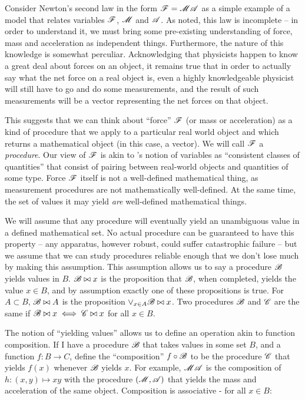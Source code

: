 Consider Newton's second law in the form $\mathscr{F}=\mathscr{MA}$ as a simple example of a model that relates variables $\mathscr{F}$, $\mathscr{M}$ and $\mathscr{A}$. As \citet{feynman_feynman_1979} noted, this law is incomplete -- in order to understand it, we must bring some pre-existing understanding of force, mass and acceleration as independent things. Furthermore, the nature of this knowledge is somewhat perculiar. Acknowledging that physicists happen to know a great deal about forces on an object, it remains true that in order to actually say what the net force on a real object is, even a highly knowledgeable physicist will still have to go and do some measurements, and the result of such measurements will be a vector representing the net forces on that object.

This suggests that we can think about ``force'' $\mathscr{F}$ (or mass or acceleration) as a kind of procedure that we apply to a particular real world object and which returns a mathematical object (in this case, a vector). We will call $\mathscr{F}$ a \emph{procedure}. Our view of $\mathscr{F}$ is akin to \citet{menger_random_2003}'s notion of variables as ``consistent classes of quantities'' that consist of pairing between real-world objects and quantities of some type. Force $\mathscr{F}$ itself is not a well-defined mathematical thing, as measurement procedures are not mathematically well-defined. At the same time, the set of values it may yield \emph{are} well-defined mathematical things.

We will assume that any procedure will eventually yield an unambiguous value in a defined mathematical set. No actual procedure can be guaranteed to have this property -- any apparatus, however robust, could suffer catastrophic failure -- but we assume that we can study procedures reliable enough that we don't lose much by making this assumption. This assumption allows us to say a procedure $\mathscr{B}$ yields values in $B$. $\mathscr{B}\bowtie x$ is the proposition that $\mathscr{B}$, when completed, yields the value $x\in B$, and by assumption exactly one of these propositions is true. For $A\subset B$, $\mathscr{B}\bowtie A$ is the proposition $\lor_{x\in A} \mathscr{B}\bowtie x$. Two procedures $\mathscr{B}$ and $\mathscr{C}$ are the same if $\mathscr{B}\bowtie x\iff \mathscr{C}\bowtie x$ for all $x\in B$. 

The notion of ``yielding values'' allows us to define an operation akin to function composition. If I have a procedure $\mathscr{B}$ that takes values in some set $B$, and a function $f:B\to C$, define the ``composition'' $f\circ \mathscr{B}$ to be the procedure $\mathscr{C}$ that yields $f(x)$ whenever $\mathscr{B}$ yields $x$. For example, $\mathscr{MA}$ is the composition of $h:(x,y)\mapsto xy$ with the procedure $(\mathscr{M},\mathscr{A})$ that yields the mass and acceleration of the same object. Composition is associative - for all $x\in B$: 

